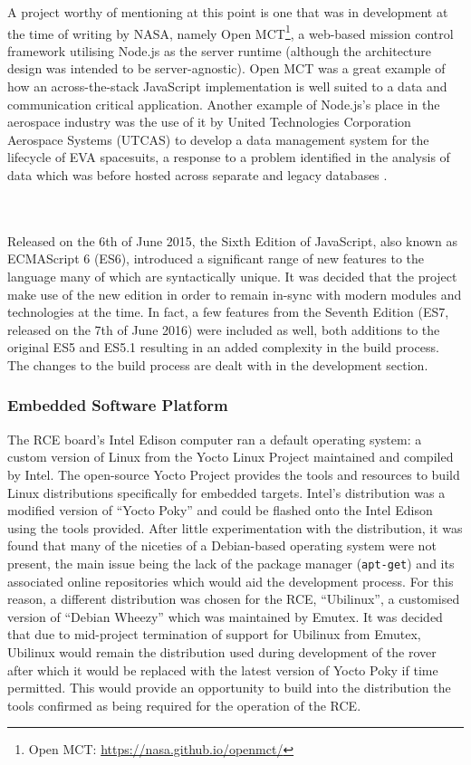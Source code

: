         A project worthy of mentioning at this point is one that was in development at the time of writing by NASA, namely Open MCT\footnote{Open MCT: \url{https://nasa.github.io/openmct/}}, a web-based mission control framework utilising Node.js as the server runtime (although the architecture design was intended to be server-agnostic). Open MCT was a great example of how an across-the-stack JavaScript implementation is well suited to a data and communication critical application. Another example of Node.js's place in the aerospace industry was the use of it by United Technologies Corporation Aerospace Systems (UTCAS) to develop a data management system for the lifecycle of EVA spacesuits, a response to a problem identified in the analysis of data which was before hosted across separate and legacy databases \cite{nodejsSpaceSuit_2016}.        
        
      \\\\
        Released on the 6th of June 2015, the Sixth Edition of JavaScript, also known as ECMAScript 6 (ES6), introduced a significant range of new features to the language many of which are syntactically unique. It was decided that the project make use of the new edition in order to remain in-sync with modern modules and technologies at the time. In fact, a few features from the Seventh Edition (ES7, released on the 7th of June 2016) were included as well, both additions to the original ES5 and ES5.1 resulting in an added complexity in the build process. The changes to the build process are dealt with in the development section.
        
    \subsubsection{Embedded Software Platform}
      The RCE board's Intel Edison computer ran a default operating system: a custom version of Linux from the Yocto Linux Project maintained and compiled by Intel. The open-source Yocto Project provides the tools and resources to build Linux distributions specifically for embedded targets. Intel's distribution was a modified version of ``Yocto Poky'' and could be flashed onto the Intel Edison using the tools provided. After little experimentation with the distribution, it was found that many of the niceties of a Debian-based operating system were not present, the main issue being the lack of the package manager (\texttt{apt-get}) and its associated online repositories which would aid the development process. For this reason, a different distribution was chosen for the RCE, ``Ubilinux'', a customised version of ``Debian Wheezy'' which was maintained by Emutex. It was decided that due to mid-project termination of support for Ubilinux from Emutex, Ubilinux would remain the distribution used during development of the rover after which it would be replaced with the latest version of Yocto Poky if time permitted. This would provide an opportunity to build into the distribution the tools confirmed as being required for the operation of the RCE.
    
